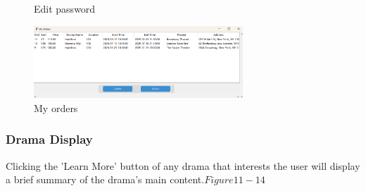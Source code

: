 \documentclass[12pt]{article}
\begin{document}
\begin{figure}[H]
\begin{minipage}{0.45\textwidth}
        \caption{Edit password}
        \label{Figure 9}
    \end{minipage}
\end{figure}

\begin{figure}[H]
    \centering
    \includegraphics[width=0.7\textwidth]{10.png}
    \caption{My orders}
    \label{Figure 10}
\end{figure}

\subsubsection{Drama Display}
\par Clicking the 'Learn More' button of any drama that interests the user will display a brief summary of the drama's main content.\(Figure11-14\)
\end{document}
